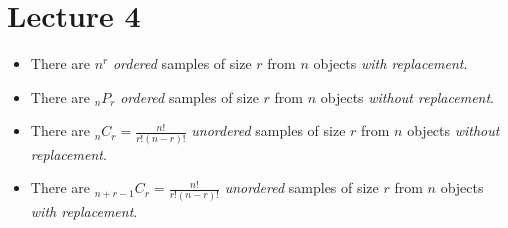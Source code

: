 \documentclass[class=article, crop=false]{standalone}
\begin{document}
  \section{Lecture 4}
  \begin{itemize}
    \item There are $n^r$ \emph{ordered} samples of size $r$ from $n$ objects \emph{with replacement}.
    \item There are $\phantom{}_nP_r$ \emph{ordered} samples of size $r$ from $n$ objects \emph{without replacement}.
    \item There are $\phantom{}_nC_r = \frac{n!}{r!(n - r)!}$ \emph{unordered} samples of size $r$ from $n$ objects \emph{without replacement}.
    \item There are $\phantom{}_{n + r - 1}C_r = \frac{n!}{r!(n - r)!}$ \emph{unordered} samples of size $r$ from $n$ objects \emph{with replacement}.
  \end{itemize}
\end{document}
